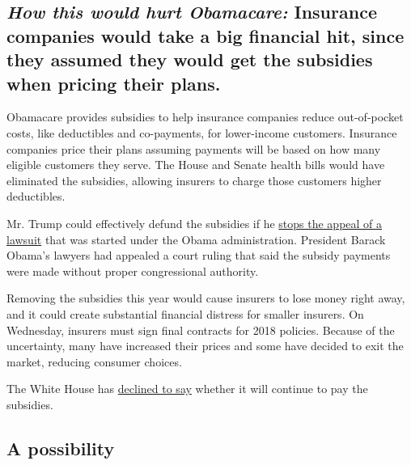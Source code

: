 \hypertarget{how-this-would-hurt-obamacare-insurance-companies-would-take-a-big-financial-hit-since-they-assumed-they-would-get-the-subsidies-when-pricing-their-plans}{%
\subsection{\texorpdfstring{\emph{How this would hurt Obamacare:}
Insurance companies would take a big financial hit, since they assumed
they would get the subsidies when pricing their
plans.}{How this would hurt Obamacare: Insurance companies would take a big financial hit, since they assumed they would get the subsidies when pricing their plans.}}\label{how-this-would-hurt-obamacare-insurance-companies-would-take-a-big-financial-hit-since-they-assumed-they-would-get-the-subsidies-when-pricing-their-plans}}

Obamacare provides subsidies to help insurance companies reduce
out-of-pocket costs, like deductibles and co-payments, for lower-income
customers. Insurance companies price their plans assuming payments will
be based on how many eligible customers they serve. The House and Senate
health bills would have eliminated the subsidies, allowing insurers to
charge those customers higher deductibles.

Mr. Trump could effectively defund the subsidies if he
\href{https://www.nytimes.com/2017/03/24/upshot/trumps-choice-on-obamacare-sabotage-or-co-opt.html}{stops
the appeal of a lawsuit} that was started under the Obama
administration. President Barack Obama's lawyers had appealed a court
ruling that said the subsidy payments were made without proper
congressional authority.

Removing the subsidies this year would cause insurers to lose money
right away, and it could create substantial financial distress for
smaller insurers. On Wednesday, insurers must sign final contracts for
2018 policies. Because of the uncertainty, many have increased their
prices and some have decided to exit the market, reducing consumer
choices.

The White House has
\href{https://www.nytimes.com/2017/07/18/upshot/obamacares-future-now-depends-on-an-unhappy-white-house.html}{declined
to say} whether it will continue to pay the subsidies.

\hypertarget{a-possibility-1}{%
\subsection{A possibility}\label{a-possibility-1}}

